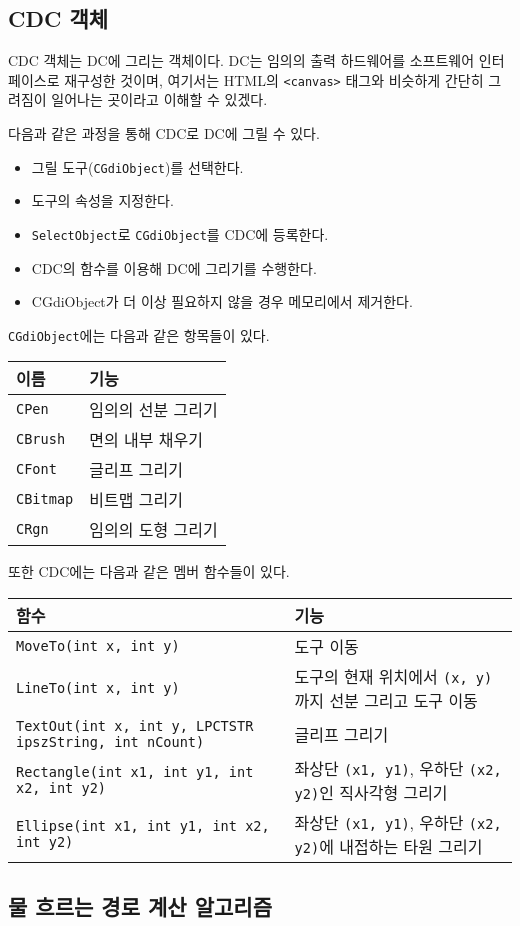 \subsection{CDC 객체}
CDC 객체는 DC에 그리는 객체이다.
DC는 임의의 출력 하드웨어를 소프트웨어 인터페이스로 재구성한 것이며, 여기서는 HTML의 \texttt{<canvas>} 태그와
비슷하게 간단히 그려짐이 일어나는 곳이라고 이해할 수 있겠다.

다음과 같은 과정을 통해 CDC로 DC에 그릴 수 있다.
\begin{itemize}
	\item 그릴 도구(\texttt{CGdiObject})를 선택한다.
	\item 도구의 속성을 지정한다.
	\item \texttt{SelectObject}로 \texttt{CGdiObject}를 CDC에 등록한다.
	\item CDC의 함수를 이용해 DC에 그리기를 수행한다.
	\item CGdiObject가 더 이상 필요하지 않을 경우 메모리에서 제거한다.
\end{itemize}

\texttt{CGdiObject}에는 다음과 같은 항목들이 있다.

\begin{tabularx}{\textwidth}{l|X}
	이름 & 기능 \\
	\hline
	\texttt{CPen} & 임의의 선분 그리기 \\
	\texttt{CBrush} & 면의 내부 채우기 \\
	\texttt{CFont} & 글리프 그리기 \\
	\texttt{CBitmap} & 비트맵 그리기 \\
	\texttt{CRgn} & 임의의 도형 그리기 \\
\end{tabularx}

또한 CDC에는 다음과 같은 멤버 함수들이 있다.

\begin{tabularx}{\textwidth}{l|X}
	함수 & 기능 \\
	\hline
	\texttt{MoveTo(int x, int y)} & 도구 이동 \\
	\texttt{LineTo(int x, int y)} & 도구의 현재 위치에서 \texttt{(x, y)}까지 선분 그리고 도구 이동 \\
	\texttt{TextOut(int x, int y, LPCTSTR ipszString, int nCount)} & 글리프 그리기 \\
	\texttt{Rectangle(int x1, int y1, int x2, int y2)} & 좌상단 \texttt{(x1, y1)}, 우하단 \texttt{(x2, y2)}인 직사각형 그리기 \\
	\texttt{Ellipse(int x1, int y1, int x2, int y2)} & 좌상단 \texttt{(x1, y1)}, 우하단 \texttt{(x2, y2)}에 내접하는 타원 그리기 \\
\end{tabularx}

\subsection{물 흐르는 경로 계산 알고리즘}



